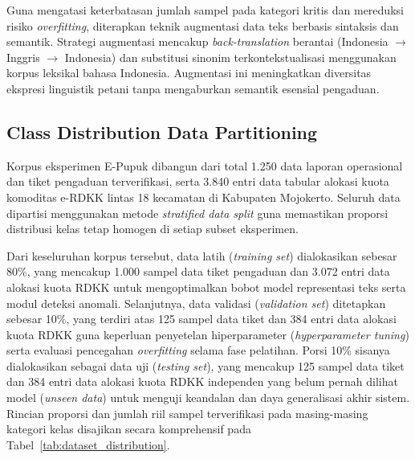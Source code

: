 ﻿\documentclass[conference]{IEEEtran}
\begin{document}
Guna mengatasi keterbatasan jumlah sampel pada kategori kritis dan mereduksi risiko \textit{overfitting}, diterapkan teknik augmentasi data teks berbasis sintaksis dan semantik. Strategi augmentasi mencakup \textit{back-translation} berantai (Indonesia $\rightarrow$ Inggris $\rightarrow$ Indonesia) dan substitusi sinonim terkontekstualisasi menggunakan korpus leksikal bahasa Indonesia. Augmentasi ini meningkatkan diversitas ekspresi linguistik petani tanpa mengaburkan semantik esensial pengaduan.

\subsection{Class Distribution Data Partitioning}
Korpus eksperimen E-Pupuk dibangun dari total 1.250 data laporan operasional dan tiket pengaduan terverifikasi, serta 3.840 entri data tabular alokasi kuota komoditas e-RDKK lintas 18 kecamatan di Kabupaten Mojokerto. Seluruh data dipartisi menggunakan metode \textit{stratified data split} guna memastikan proporsi distribusi kelas tetap homogen di setiap subset eksperimen.

Dari keseluruhan korpus tersebut, data latih (\textit{training set}) dialokasikan sebesar 80\%, yang mencakup 1.000 sampel data tiket pengaduan dan 3.072 entri data alokasi kuota RDKK untuk mengoptimalkan bobot model representasi teks serta modul deteksi anomali. Selanjutnya, data validasi (\textit{validation set}) ditetapkan sebesar 10\%, yang terdiri atas 125 sampel data tiket dan 384 entri data alokasi kuota RDKK guna keperluan penyetelan hiperparameter (\textit{hyperparameter tuning}) serta evaluasi pencegahan \textit{overfitting} selama fase pelatihan. Porsi 10\% sisanya dialokasikan sebagai data uji (\textit{testing set}), yang mencakup 125 sampel data tiket dan 384 entri data alokasi kuota RDKK independen yang belum pernah dilihat model (\textit{unseen data}) untuk menguji keandalan dan daya generalisasi akhir sistem. Rincian proporsi dan jumlah riil sampel terverifikasi pada masing-masing kategori kelas disajikan secara komprehensif pada Tabel~\ref{tab:dataset_distribution}.
\end{document}
